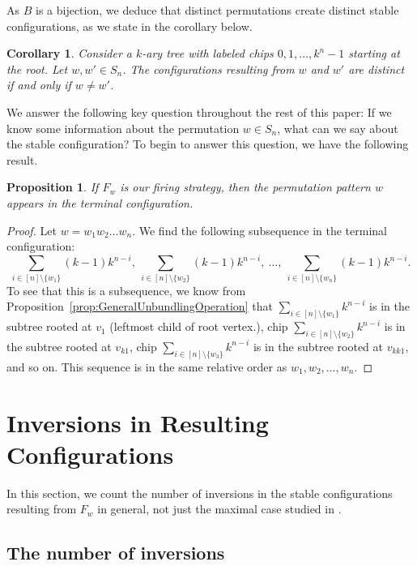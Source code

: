 \documentclass[final]{dmtcs-episciences}
\newtheorem{corollary}[theorem]{Corollary} %
\newtheorem{proposition}[theorem]{Proposition}
\theoremstyle{definition}
\theoremstyle{remark}
\begin{document}
As $B$ is a bijection, we deduce that distinct permutations create distinct stable configurations, as we state in the corollary below.

\begin{corollary}
  Consider a $k$-ary tree with labeled chips $0, 1, \dots, k^n-1$ starting at the root. Let $w, w' \in S_n$. The configurations resulting from $w$ and $w'$ are distinct if and only if $w \neq w'$.
\end{corollary}

We answer the following key question throughout the rest of this paper: If we know some information about the permutation $w \in S_n$, what can we say about the stable configuration? To begin to answer this question, we have the following result.

\begin{proposition}
If $F_w$ is our firing strategy, then the permutation pattern $w$ appears in the terminal configuration.
\end{proposition}

\begin{proof}
Let $w = w_1w_2\ldots w_n$. We find the following subsequence in the terminal configuration:
$$\sum_{i \in [n]\setminus \{w_1\}}(k-1)k^{n-i},\ \sum_{i \in [n]\setminus \{w_2\}}(k-1)k^{n-i},\ \dots,\ \sum_{i \in [n]\setminus \{w_n\}}(k-1)k^{n-i}.$$
To see that this is a subsequence, we know from Proposition~\ref{prop:GeneralUnbundlingOperation} that $\sum_{i \in [n]\setminus \{w_1\}}k^{n-i}$ is in the subtree rooted at $v_{1}$ (leftmost child of root vertex.), chip $\sum_{i \in [n]\setminus \{w_2\}}k^{n-i}$ is in the subtree rooted at $v_{k1}$, chip $\sum_{i \in [n]\setminus \{w_3\}}k^{n-i}$ is in the subtree rooted at $v_{kk1}$, and so on. This sequence is in the same relative order as $w_1, w_2, \dots, w_n$.
\end{proof}

\section{Inversions in Resulting Configurations}
\label{sec:inversions}

In this section, we count the number of inversions in the stable configurations resulting from $F_w$ in general, not just the maximal case studied in \cite{MR4887467}.

\subsection{The number of inversions}
\end{document}
